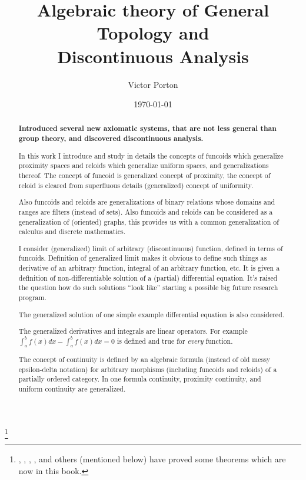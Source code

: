 \documentclass[a4paper,oneside,english,reqno]{amsbook}
\numberwithin{section}{chapter}
\begin{document}
\title{Algebraic theory of General Topology and\\Discontinuous Analysis}


\author{Victor Porton}






\date{\today}


\thanks{, , , , and others (mentioned below) have proved some theorems which are now in this book.}
\begin{abstract}
\textbf{Introduced several new axiomatic systems, that are not less general than group theory, and discovered discontinuous analysis.}

In this work I introduce and study in details the concepts of funcoids
which generalize proximity spaces and reloids which generalize uniform
spaces, and generalizations thereof. The concept of funcoid is generalized
concept of proximity, the concept of reloid is cleared from superfluous
details (generalized) concept of uniformity. 

Also funcoids and reloids are generalizations of binary relations
whose domains and ranges are filters (instead of sets). Also funcoids
and reloids can be considered as a generalization of (oriented) graphs,
this provides us with a common generalization of calculus and discrete
mathematics.

I consider (generalized) limit of arbitrary (discontinuous) function, defined in terms of funcoids.
Definition of generalized limit makes it obvious to define such things as derivative of an arbitrary function, integral of an arbitrary function, etc. It is given a definition of non-dif\-fe\-re\-nti\-able solution of a (partial) differential equation. It's raised the question how do such solutions ``look like'' starting a possible big future research program.

The generalized solution of one simple example differential equation is also considered.

The generalized derivatives and integrals are linear operators. For example $\int_a^b f(x)dx - \int_a^b f(x)dx = 0$ is defined and true for \emph{every} function.

The concept of continuity is defined by an algebraic formula (instead
of old messy epsilon-delta notation) for arbitrary morphisms (including
funcoids and reloids) of a partially ordered category. In one formula
continuity, proximity continuity, and uniform continuity are generalized.


\end{abstract}
\end{document}
